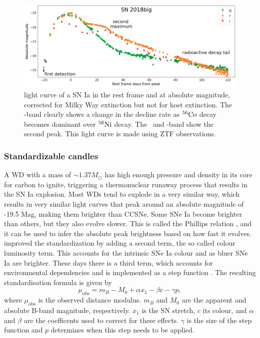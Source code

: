 \documentclass[a4paper,oneside,12pt, class=Latex/Classes/PhDthesisPSnPDF, crop=false]{standalone}
\begin{document}
\begin{figure}
    \centering
    \includegraphics[width=\textwidth]{../Images/chapter_1/Ia-norm_example.png}
    \caption{\ztfg\ztfr\ztfi light curve of a SN Ia in the rest frame and at absolute magnitude, corrected for Milky Way extinction but not for host extinction. The \ztfg-band clearly shows a change in the decline rate as $^{56}\text{Co}$ decay becomes dominant over $^{56}\text{Ni}$ decay. The \ztfr\ and \ztfi-band show the second peak. This light curve is made using ZTF observations.}
    \label{Ia-norm_example}
\end{figure}

\subsubsection{Standardizable candles}
\label{Standard_candle}
A WD with a mass of $\sim 1.37 M_\odot$ has high enough pressure and density in its core for carbon to ignite, triggering a thermonuclear runaway process that results in the SN Ia explosion. Most WDs tend to explode in a very similar way, which results in very similar light curves that peak around an absolute magnitude of -19.5 Mag, making them brighter than CCSNe. Some SNe Ia become brighter than others, but they also evolve slower. This is called the Phillips relation \citep{phillips_rel}, and it can be used to infer the absolute peak brightness based on how fast it evolves. \citet{Tripp_colour_rel} improved the standardization by adding a second term, the so called colour luminosity term. This accounts for the intrinsic SNe Ia colour and as bluer SNe Ia are brighter. These days there is a third term, which accounts for environmental dependencies and is implemented as a step function \citep{Kelly_mass_step, Sullivan_mass_step}. The resulting standardisation formula is given by
\begin{equation}
    \mu_\text{obs} = m_B - M_0 + \alpha x_1 - \beta c - \gamma p,
\end{equation}
where $\mu_\text{obs}$ is the observed distance modulus. $m_B$ and $M_0$ are the apparent and absolute B-band magnitude, respectively. $x_1$ is the SN stretch, $c$ its colour, and $\alpha$ and $\beta$ are the coefficents used to correct for these effects. $\gamma$ is the size of the step function and $p$ determines when this step needs to be applied.
\end{document}
